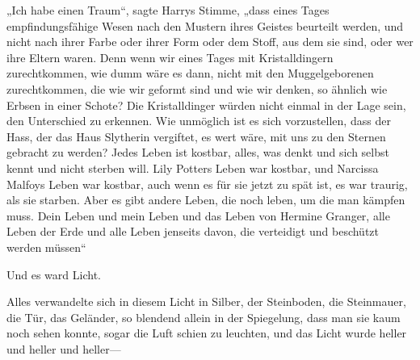 „Ich habe einen Traum“, sagte Harrys Stimme, „dass eines Tages empfindungsfähige Wesen nach den Mustern ihres Geistes beurteilt werden, und nicht nach ihrer Farbe oder ihrer Form oder dem Stoff, aus dem sie sind, oder wer ihre Eltern waren. Denn wenn wir eines Tages mit Kristalldingern zurechtkommen, wie dumm wäre es dann, nicht mit den Muggelgeborenen zurechtkommen, die wie wir geformt sind und wie wir denken, so ähnlich wie Erbsen in einer Schote? Die Kristalldinger würden nicht einmal in der Lage sein, den Unterschied zu erkennen. Wie unmöglich ist es sich vorzustellen, dass der Hass, der das Haus Slytherin vergiftet, es wert wäre, mit uns zu den Sternen gebracht zu werden? Jedes Leben ist kostbar, alles, was denkt und sich selbst kennt und nicht sterben will. Lily Potters Leben war kostbar, und Narcissa Malfoys Leben war kostbar, auch wenn es für sie jetzt zu spät ist, es war traurig, als sie starben. Aber es gibt andere Leben, die noch leben, um die man kämpfen muss. Dein Leben und mein Leben und das Leben von Hermine Granger, alle Leben der Erde und alle Leben jenseits davon, die verteidigt und beschützt werden müssen“ 

Und es ward Licht.

Alles verwandelte sich in diesem Licht in Silber, der Steinboden, die Steinmauer, die Tür, das Geländer, so blendend allein in der Spiegelung, dass man sie kaum noch sehen konnte, sogar die Luft schien zu leuchten, und das Licht wurde heller und heller und heller—

